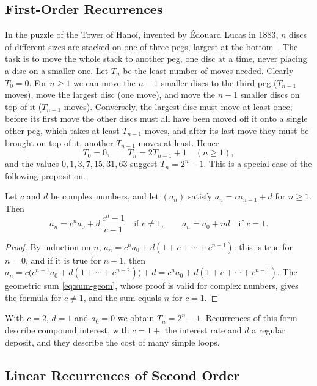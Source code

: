 \subsection{First-Order Recurrences}

In the puzzle of the Tower of Hanoi, invented by \'Edouard Lucas in 1883, $n$ discs of different sizes are stacked on one of three pegs, largest at the bottom~\cite[Sect.~1.1]{graham1994concrete}. The task is to move the whole stack to another peg, one disc at a time, never placing a disc on a smaller one. Let $T_n$ be the least number of moves needed. Clearly $T_0=0$. For $n\ge1$ we can move the $n-1$ smaller discs to the third peg ($T_{n-1}$ moves), move the largest disc (one move), and move the $n-1$ smaller discs on top of it ($T_{n-1}$ moves). Conversely, the largest disc must move at least once; before its first move the other discs must all have been moved off it onto a single other peg, which takes at least $T_{n-1}$ moves, and after its last move they must be brought on top of it, another $T_{n-1}$ moves at least. Hence
\[
T_0=0,\qquad T_n=2T_{n-1}+1\quad(n\ge1),
\]
and the values $0,1,3,7,15,31,63$ suggest $T_n=2^n-1$. This is a special case of the following proposition.

\begin{proposition}
\label{prop:first-order}
Let $c$ and $d$ be complex numbers, and let $(a_n)$ satisfy $a_n=ca_{n-1}+d$ for $n\ge1$. Then
\[
a_n=c^na_0+d\,\frac{c^n-1}{c-1}\quad\text{if }c\ne1,\qquad a_n=a_0+nd\quad\text{if }c=1 .
\]
\end{proposition}

\begin{proof}
By induction on $n$, $a_n=c^na_0+d(1+c+\cdots+c^{n-1})$: this is true for $n=0$, and if it is true for $n-1$, then $a_n=c\bigl(c^{n-1}a_0+d(1+\cdots+c^{n-2})\bigr)+d=c^na_0+d(1+c+\cdots+c^{n-1})$. The geometric sum \eqref{eq:sum-geom}, whose proof is valid for complex numbers, gives the formula for $c\ne1$, and the sum equals $n$ for $c=1$.
\end{proof}

With $c=2$, $d=1$ and $a_0=0$ we obtain $T_n=2^n-1$. Recurrences of this form describe compound interest, with $c=1+$ the interest rate and $d$ a regular deposit, and they describe the cost of many simple loops.

\subsection{Linear Recurrences of Second Order}

